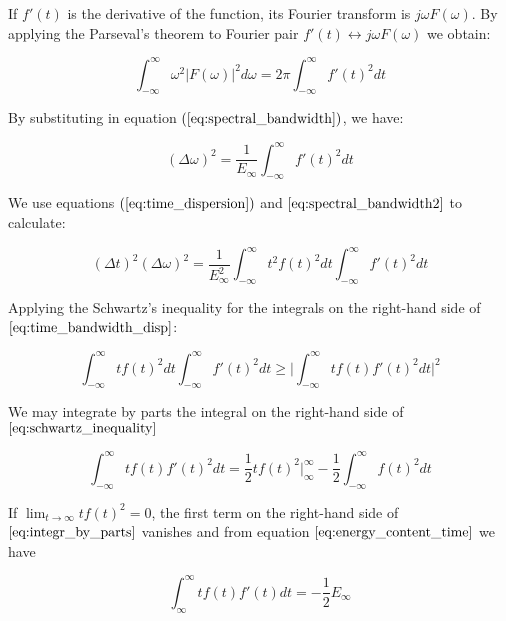 If $f'(t)$ is the derivative of the function, its Fourier transform is $j\omega F(\omega)$. By applying the Parseval's theorem to Fourier pair $f'(t)\longleftrightarrow j\omega F(\omega)$ we obtain:

\begin{equation}\label{eq:}
    \int_{-\infty}^{\infty} \omega^2 |F(\omega)|^2 d\omega = 2 \pi \int_{-\infty}^{\infty} f'(t)^2 dt
\end{equation}

By substituting in equation $(\eqref{eq:spectral_bandwidth})$, we have:

\begin{equation}\label{eq:spectral_bandwidth2}
    (\Delta \omega)^2 = \frac{1}{E_{\infty}} \int_{-\infty}^{\infty} f'(t)^2 dt
\end{equation}

We use equations $(\eqref{eq:time_dispersion})$ and $\eqref{eq:spectral_bandwidth2}$ to calculate:

\begin{equation}\label{eq:time_bandwidth_disp}
    (\Delta t)^2(\Delta \omega)^2 = \frac{1}{E_{\infty}^{2}} \int_{-\infty}^{\infty} t^2f(t)^2 dt \int_{-\infty}^{\infty}f'(t)^2 dt
\end{equation}

Applying the Schwartz's inequality for the integrals on the right-hand side of $\eqref{eq:time_bandwidth_disp}$:

\begin{equation}\label{eq:schwartz_inequality}
    \int_{-\infty}^{\infty}tf(t)^2 dt \int_{-\infty}^{\infty}f'(t)^2 dt  \geq \biggr\rvert \int_{-\infty}^{\infty}tf(t)f'(t)^2 dt \biggr\rvert^{2}
\end{equation}


We may integrate by parts the integral on the right-hand side of $\eqref{eq:schwartz_inequality}$

\begin{equation}\label{eq:integr_by_parts}
    \int_{-\infty}^{\infty}tf(t)f'(t)^2 dt =  \frac{1}{2}tf(t)^2 \biggr\rvert_{\infty}^{\infty} - \frac{1}{2} \int_{-\infty}^{\infty}f(t)^2 dt
\end{equation}

If $\lim_{t\rightarrow \infty} tf(t)^2=0$, the first term on the right-hand side of $\eqref{eq:integr_by_parts}$ vanishes and from equation $\eqref{eq:energy_content_time}$ we have

\begin{equation}\label{eq:}
    \int_{\infty}^{\infty} tf(t)f'(t) dt = -\frac{1}{2} E_{\infty}
\end{equation}

